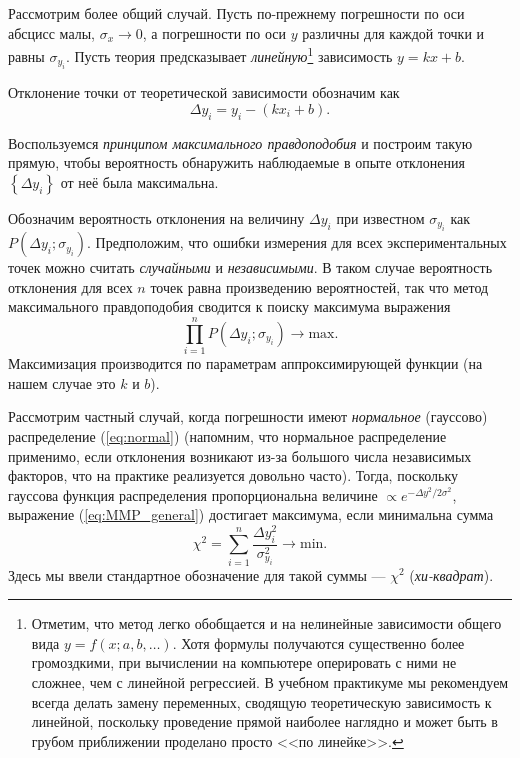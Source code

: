 \documentclass[10pt]{article}
\begin{document}
{\small{}Рассмотрим более общий случай. Пусть по-прежнему погрешности
по оси абсцисс малы, $\sigma_{x}\to0$, а погрешности по оси $y$
различны для каждой точки и равны $\sigma_{y_{i}}$. Пусть теория
предсказывает }\emph{\small{}линейную}\footnote{{\footnotesize{}Отметим, что метод легко обобщается и на нелинейные
зависимости общего вида $y=f\left(x;a,b,\ldots\right)$. Хотя формулы
получаются существенно более громоздкими, при вычислении на компьютере
оперировать с ними не сложнее, чем с линейной регрессией. В учебном
практикуме мы рекомендуем всегда делать замену переменных, сводящую
теоретическую зависимость к линейной, поскольку проведение прямой
наиболее наглядно и может быть в грубом приближении проделано просто
<<по линейке>>.}}{\small{} зависимость $y=kx+b$.}{\small\par}

{\small{}Отклонение точки от теоретической зависимости обозначим как
\[
\Delta y_{i}=y_{i}-\left(kx_{i}+b\right).
\]
}{\small\par}

{\small{}Воспользуемся }\emph{\small{}принципом максимального правдоподобия}{\small{}
и построим такую прямую, чтобы вероятность обнаружить наблюдаемые
в опыте отклонения $\left\{ \Delta y_{i}\right\} $ от неё была максимальна.}{\small\par}

{\small{}Обозначим вероятность отклонения на величину $\Delta y_{i}$
при известном $\sigma_{y_{i}}$ как $P\!\left(\Delta y_{i};\sigma_{y_{i}}\right)$.
Предположим, что ошибки измерения для всех экспериментальных точек
можно считать }\emph{\small{}случайными}{\small{} и }\emph{\small{}независимыми}{\small{}.
В таком случае вероятность отклонения для всех $n$ точек равна произведению
вероятностей, так что метод максимального правдоподобия сводится к
поиску максимума выражения
\begin{equation}
\prod\limits _{i=1}^{n}P\!\left(\Delta y_{i};\sigma_{y_{i}}\right)\to\mathrm{max}.\label{eq:MMP_general}
\end{equation}
Максимизация производится по параметрам аппроксимирующей функции (на
нашем случае это $k$ и $b$).}{\small\par}

{\small{}Рассмотрим частный случай, когда погрешности имеют }\emph{\small{}нормальное}{\small{}
(гауссово) распределение (\ref{eq:normal}) (напомним, что нормальное
распределение применимо, если отклонения возникают из-за большого
числа независимых факторов, что на практике реализуется довольно часто).
Тогда, поскольку гауссова функция распределения пропорциональна величине
$\propto e^{-\Delta y^{2}/2\sigma^{2}}$, выражение (\ref{eq:MMP_general})
достигает максимума, если минимальна сумма
\begin{equation}
\boxed{\chi^{2}=\sum_{i=1}^{n}\frac{\Delta y_{i}^{2}}{\sigma_{y_{i}}^{2}}\to\mathrm{min}}.\label{eq:chi2}
\end{equation}
Здесь мы ввели стандартное обозначение для такой суммы ---
$\chi^{2}$ (}\emph{\small{}хи-квадрат}{\small{}).}{\small\par}
\end{document}
